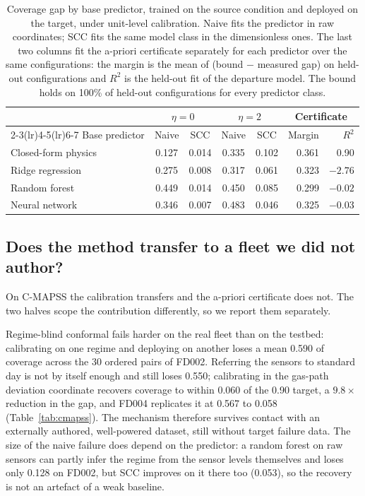 \begin{table}[t]\centering\footnotesize
\setlength{\tabcolsep}{10pt}\renewcommand{\arraystretch}{1.2}
\caption{Coverage gap by base predictor, trained on the source condition and deployed on the
target, under unit-level calibration. Naive fits the predictor in raw coordinates; SCC fits the same
model class in the dimensionless ones. The last two columns fit the a-priori certificate separately
for each predictor over the same configurations: the margin is the mean of (bound $-$ measured gap)
on held-out configurations and $R^2$ is the held-out fit of the departure model. The bound holds on
100\% of held-out configurations for every predictor class.}\label{tab:basemodel}
\begin{tabular}{@{}lccccrr@{}}\toprule
& \multicolumn{2}{c}{$\eta=0$} & \multicolumn{2}{c}{$\eta=2$}
& \multicolumn{2}{c}{Certificate} \\\cmidrule(lr){2-3}\cmidrule(lr){4-5}\cmidrule(lr){6-7}
Base predictor & Naive & SCC & Naive & SCC & Margin & $R^2$ \\\midrule
Closed-form physics & 0.127 & 0.014 & 0.335 & 0.102 & 0.361 & 0.90 \\
Ridge regression    & 0.275 & 0.008 & 0.317 & 0.061 & 0.323 & $-2.76$ \\
Random forest       & 0.449 & 0.014 & 0.450 & 0.085 & 0.299 & $-0.02$ \\
Neural network      & 0.346 & 0.007 & 0.483 & 0.046 & 0.325 & $-0.03$ \\\bottomrule
\end{tabular}
\end{table}

\subsection{Does the method transfer to a fleet we did not author?}\label{sec:res-cmapss}
On C-MAPSS the calibration transfers and the a-priori certificate does not. The two halves scope the
contribution differently, so we report them separately.

Regime-blind conformal fails harder on the real fleet than on the testbed: calibrating on one regime
and deploying on another loses a mean 0.590 of coverage across the 30 ordered pairs of FD002.
Referring the sensors to standard day is not by itself enough and still loses 0.550; calibrating in
the gas-path deviation coordinate recovers coverage to within 0.060 of the 0.90 target, a
$9.8\times$ reduction in the gap, and FD004 replicates it at 0.567 to 0.058
(Table~\ref{tab:cmapss}). The mechanism therefore survives contact with an externally authored,
well-powered dataset, still without target failure data. The size of the naive failure does depend
on the predictor: a random forest on raw sensors can partly infer the regime from the sensor levels
themselves and loses only 0.128 on FD002, but SCC improves on it there too (0.053), so the recovery
is not an artefact of a weak baseline.

